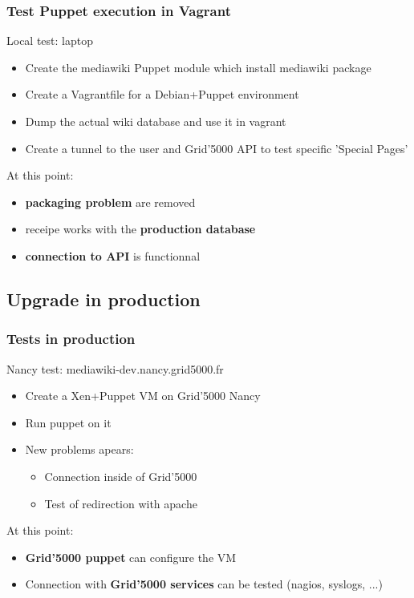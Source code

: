 \documentclass[11pt,compress]{beamer}
\begin{document}
\begin{frame}
\frametitle{Test Puppet execution in Vagrant}
\begin{block}{Local test: laptop}
\begin{itemize}
\item Create the mediawiki Puppet module which install mediawiki package
\item Create a Vagrantfile for a Debian+Puppet environment
\item Dump the actual wiki database and use it in vagrant
\item Create a tunnel to the user and Grid'5000 API to test specific 'Special Pages'
\end{itemize}
\end{block}
At this point:
\begin{itemize}
\item \textbf{packaging problem} are removed
\item receipe works with the \textbf{production database}
\item \textbf{connection to API} is functionnal
\end{itemize}
\end{frame}

\subsection{Upgrade in production}
\begin{frame}
\frametitle{Tests in production}
\begin{block}{Nancy test: mediawiki-dev.nancy.grid5000.fr}
\begin{itemize}
\item Create a Xen+Puppet VM on Grid'5000 Nancy 
\item Run puppet on it
\item New problems apears:
\begin{itemize}
\item Connection inside of Grid'5000
\item Test of redirection with apache
\end{itemize}
\end{itemize}
\end{block}
At this point:
\begin{itemize}
\item \textbf{Grid'5000 puppet} can configure the VM
\item Connection with \textbf{Grid'5000 services} can be tested (nagios, syslogs, ...)
\end{itemize}
\end{frame}
\end{document}
